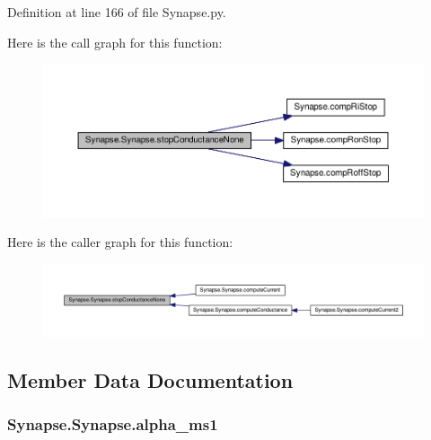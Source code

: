 Definition at line 166 of file Synapse.\-py.



Here is the call graph for this function\-:\nopagebreak
\begin{figure}[H]
\begin{center}
\leavevmode
\includegraphics[width=350pt]{class_synapse_1_1_synapse_aa8deb85e48c1a9b27453e0ebde27b2cf_cgraph}
\end{center}
\end{figure}




Here is the caller graph for this function\-:\nopagebreak
\begin{figure}[H]
\begin{center}
\leavevmode
\includegraphics[width=350pt]{class_synapse_1_1_synapse_aa8deb85e48c1a9b27453e0ebde27b2cf_icgraph}
\end{center}
\end{figure}




\subsection{Member Data Documentation}
\hypertarget{class_synapse_1_1_synapse_ae15502cd5d5604d38328b2b1432477d7}{
\subsubsection[{alpha\-\_\-ms1}]{\setlength{\rightskip}{0pt plus 5cm}Synapse.\-Synapse.\-alpha\-\_\-ms1}}\label{class_synapse_1_1_synapse_ae15502cd5d5604d38328b2b1432477d7}


